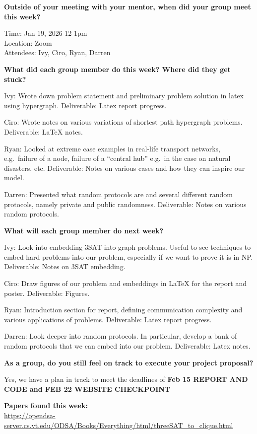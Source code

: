 \textbf{Outside of your meeting with your mentor, when did your group
meet this week?}

Time: Jan 19, 2026 12-1pm\\
Location: Zoom\\
Attendees: Ivy, Ciro, Ryan, Darren

\textbf{What did each group member do this week? Where did they get
stuck?}

Ivy: Wrote down problem statement and preliminary problem solution in
latex using hypergraph. Deliverable: Latex report progress.

Ciro: Wrote notes on various variations of shortest path hypergraph
problems. Deliverable: LaTeX notes.

Ryan: Looked at extreme case examples in real-life transport networks,
e.g.~failure of a node, failure of a ``central hub'' e.g.~in the case on
natural disasters, etc. Deliverable: Notes on various cases and how they
can inspire our model.

Darren: Presented what random protocols are and several different random
protocols, namely private and public randomness. Deliverable: Notes on
various random protocols.

\textbf{What will each group member do next week?}

Ivy: Look into embedding 3SAT into graph problems. Useful to see
techniques to embed hard problems into our problem, especially if we
want to prove it is in NP. Deliverable: Notes on 3SAT embedding.

Ciro: Draw figures of our problem and embeddings in LaTeX for the report
and poster. Deliverable: Figures.

Ryan: Introduction section for report, defining communication complexity
and various applications of problems. Deliverable: Latex report
progress.

Darren: Look deeper into random protocols. In particular, develop a bank
of random protocols that we can embed into our problem. Deliverable:
Latex notes.

\textbf{As a group, do you still feel on track to execute your project
proposal?}

Yes, we have a plan in track to meet the deadlines of \textbf{Feb 15
REPORT AND CODE and FEB 22 WEBSITE CHECKPOINT}

\textbf{Papers found this week:}\\
\url{https://opendsa-server.cs.vt.edu/ODSA/Books/Everything/html/threeSAT_to_clique.html}


